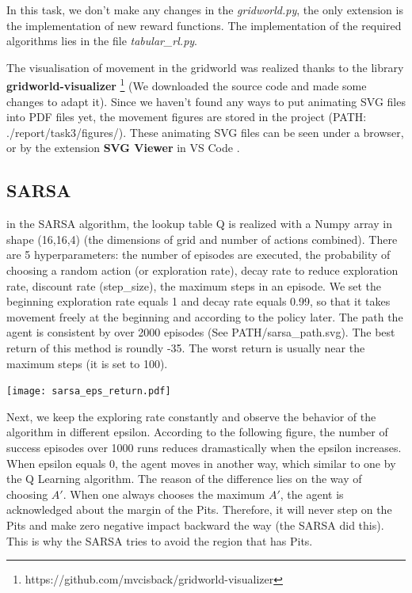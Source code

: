 \documentclass[11pt]{article}
\begin{document}
In this task, we don't make any changes in the \textit{gridworld.py}, the only extension is the implementation of new reward functions. The implementation of the required algorithms lies in the file \textit{tabular\_rl.py}.

The visualisation of movement in the gridworld was realized thanks to the library \textbf{gridworld-visualizer} \footnote{https://github.com/mvcisback/gridworld-visualizer} (We downloaded the source code and made some changes to adapt it). Since we haven't found any ways to put animating SVG files into PDF files yet, the movement figures are stored in the project (PATH: ./report/task3/figures/). These animating SVG files can be seen under a browser, or by the extension \textbf{SVG Viewer} in VS Code .

\subsection{SARSA}

in the SARSA algorithm, the lookup table Q is realized with a Numpy array in shape (16,16,4) (the dimensions of grid and number of actions combined). There are 5 hyperparameters: the number of episodes are executed, the probability of choosing a random action (or exploration rate), decay rate to reduce exploration rate, discount rate (step\_size), the maximum steps in an episode. We set the beginning exploration rate equals 1 and decay rate equals 0.99, so that it takes movement freely at the beginning and according to the policy later. The path the agent is consistent by over 2000 episodes (See PATH/sarsa\_path.svg). The best return of this method is roundly -35. The worst return is usually near the maximum steps (it is set to 100).

\texttt{[image: sarsa\_eps\_return.pdf]}

Next, we keep the exploring rate constantly and observe the behavior of the algorithm in different epsilon. According to the following figure, the number of success episodes over 1000 runs reduces dramastically when the epsilon increases. When epsilon equals 0, the agent moves in another way, which similar to one by the Q Learning algorithm. The reason of the difference lies on the way of choosing $A'$. When one always chooses the maximum $A'$, the agent is acknowledged about the margin of the Pits. Therefore, it will never step on the Pits and make zero negative impact backward the way (the SARSA did this). This is why the SARSA tries to avoid the region that has Pits.
\end{document}
